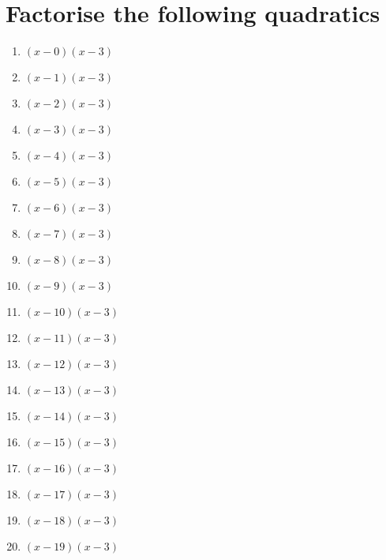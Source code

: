 \documentclass{article}%
\begin{document}
%
\normalsize%
\section{Factorise the following quadratics}%
\label{sec:Factorisethefollowingquadratics}%
\begin{enumerate}%
\item%
$(x-0)(x-3)$%
\item%
$(x-1)(x-3)$%
\item%
$(x-2)(x-3)$%
\item%
$(x-3)(x-3)$%
\item%
$(x-4)(x-3)$%
\item%
$(x-5)(x-3)$%
\item%
$(x-6)(x-3)$%
\item%
$(x-7)(x-3)$%
\item%
$(x-8)(x-3)$%
\item%
$(x-9)(x-3)$%
\item%
$(x-10)(x-3)$%
\item%
$(x-11)(x-3)$%
\item%
$(x-12)(x-3)$%
\item%
$(x-13)(x-3)$%
\item%
$(x-14)(x-3)$%
\item%
$(x-15)(x-3)$%
\item%
$(x-16)(x-3)$%
\item%
$(x-17)(x-3)$%
\item%
$(x-18)(x-3)$%
\item%
$(x-19)(x-3)$%
\end{enumerate}

%
\end{document}
